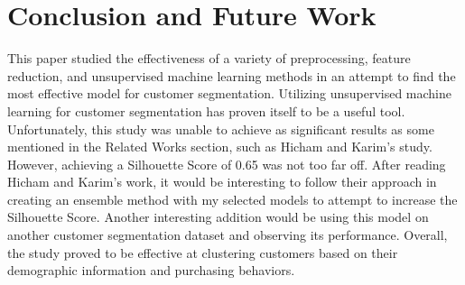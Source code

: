 \documentclass[twocolumn]{article}
\begin{document}
\section{Conclusion and Future Work}

This paper studied the effectiveness of a variety of preprocessing, feature reduction, and unsupervised machine learning methods in an attempt to find the most effective model for customer segmentation. Utilizing unsupervised machine learning for customer segmentation has proven itself to be a useful tool. Unfortunately, this study was unable to achieve as significant results as some mentioned in the Related Works section, such as Hicham and Karim's study.\cite{hicham} However, achieving a Silhouette Score of 0.65 was not too far off. After reading Hicham and Karim's work, it would be interesting to follow their approach in creating an ensemble method with my selected models to attempt to increase the Silhouette Score. Another interesting addition would be using this model on another customer segmentation dataset and observing its performance. Overall, the study proved to be effective at clustering customers based on their demographic information and purchasing behaviors.

\twocolumn[
\begin{@twocolumnfalse}
\printbibliography
\end{@twocolumnfalse}
]
\end{document}
